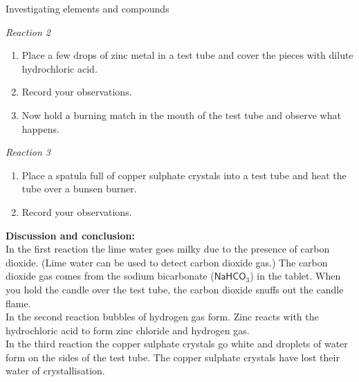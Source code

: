 \begin{g_experiment}{Investigating elements and compounds}
\begin{enumerate}[label=\textbf{\arabic*}.]
\end{enumerate}
\textsl{Reaction 2}
\begin{enumerate}[label=\textbf{\arabic*}.]
\item Place a few drops of zinc metal in a test tube and cover the pieces with dilute hydrochloric acid.
\item Record your observations.
\item Now hold a burning match in the mouth of the test tube and observe what happens.
\end{enumerate}
\textsl{Reaction 3}
\begin{enumerate}[label=\textbf{\arabic*}.]
\item Place a spatula full of copper sulphate crystals into a test tube and heat the tube over a bunsen burner.
\item Record your observations.
\end{enumerate}
\textbf{Discussion and conclusion:}\\
In the first reaction the lime water goes milky due to the presence of carbon dioxide. (Lime water can be used to detect carbon dioxide gas.) The carbon dioxide gas comes from the sodium bicarbonate ($\textsf{NaHCO}_3$) in the tablet. When you hold the candle over the test tube, the carbon dioxide snuffs out the candle flame. \\
In the second reaction bubbles of hydrogen gas form. Zinc reacts with the hydrochloric acid to form zinc chloride and hydrogen gas. \\
In the third reaction the copper sulphate crystals go white and droplets of water form on the sides of the test tube. The copper sulphate crystals have lost their water of crystallisation. 
\end{g_experiment}
{}
